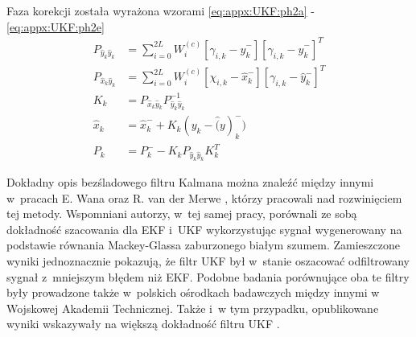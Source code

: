 Faza korekcji została wyrażona wzorami \ref{eq:appx:UKF:ph2a} - \ref{eq:appx:UKF:ph2e}
\begin{subequations}
	\begin{align}
		P_{\widehat{y}_k\widehat{y}_k} & = \sum_{i=0}^{2L}W_i^{(c)}[\gamma_{i,k} - \widehat{y}^-_k][\gamma_{i,k} - \widehat{y}^-_k]^T\label{eq:appx:UKF:ph2a} \\
		P_{\widehat{x}_k\widehat{y}_k} & = \sum_{i=0}^{2L}W_i^{(c)}[\chi_{i,k} - \widehat{x}^-_k][\gamma_{i,k} - \widehat{y}^-_k]^T\label{eq:appx:UKF:ph2b}   \\
		K_k                            & = P_{\widehat{x}_k\widehat{y}_k} P^{-1}_{\widehat{y}_k\widehat{y}_k} \label{eq:appx:UKF:ph2c}                        \\
		\widehat{x}_k                  & = \widehat{x}^-_{k} + K_k(y_k - \widehat(y)^-_k) \label{eq:appx:UKF:ph2d}                                            \\
		P_k                            & = P^-_k - K_kP_{\widehat{y}_k\widehat{y}_k}K_k^T \label{eq:appx:UKF:ph2e}                                            
	\end{align}
\end{subequations}
		
		
Dokładny opis bezśladowego filtru Kalmana można znaleźć między innymi w~pracach E. Wana oraz R. van der Merwe \cite{Wan2000, Wan2001}, którzy pracowali nad rozwinięciem tej metody. Wspomniani autorzy, w~tej samej pracy, porównali ze sobą dokładność szacowania dla EKF i~UKF wykorzystując sygnał wygenerowany na podstawie równania Mackey-Glassa \cite{Glass2010} zaburzonego białym szumem. Zamieszczone wyniki jednoznacznie pokazują, że filtr UKF był w~stanie oszacować odfiltrowany sygnał z~mniejszym błędem niż EKF. Podobne badania porównujące oba te filtry były prowadzone także w~polskich ośrodkach badawczych między innymi w Wojskowej Akademii Technicznej. Także i~w tym przypadku, opublikowane wyniki wskazywały na większą dokładność filtru UKF \cite{Konatowski2007, Konatowski2007a}.
		
